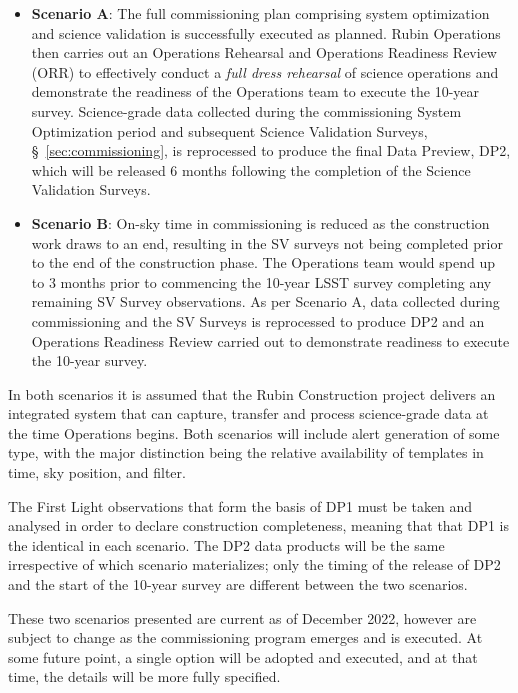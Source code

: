 \begin{itemize}
\item \textbf{Scenario A}:
The full commissioning plan comprising system optimization and science validation is successfully executed as planned. 
Rubin Operations then carries out an Operations Rehearsal and Operations Readiness Review (ORR) to effectively conduct a \textit{full dress rehearsal} of science operations and demonstrate the readiness of the Operations team to execute the 10-year survey. 
Science-grade data collected during the commissioning System Optimization period and subsequent Science Validation Surveys, \S~\ref{sec:commissioning}, is reprocessed to produce the final Data Preview, DP2, which will be released 6 months following the completion of the Science Validation Surveys.

\item \textbf{Scenario B}:
On-sky time in commissioning is reduced as the construction work  draws to an end, resulting in the SV surveys not being completed prior to the end of the construction phase.
The Operations team would spend up to 3 months prior to commencing the 10-year LSST survey completing any remaining SV Survey observations.
As per Scenario A, data collected during commissioning and the SV Surveys is reprocessed to produce DP2 and an Operations Readiness Review carried out to demonstrate readiness to execute the 10-year survey. 
\end{itemize}

In both scenarios it is assumed that the Rubin Construction project delivers an integrated system that can capture, transfer and process science-grade data at the time Operations begins.
Both scenarios will include alert generation of some type, with the major distinction being the relative availability of templates in time, sky position, and filter.

The First Light observations that form the basis of DP1 must be taken and analysed in order to declare construction completeness, meaning that that DP1 is the identical in each scenario.
The DP2 data products will be the same irrespective of which scenario materializes; only the timing of the release of DP2 and the start of the 10-year survey are different between the two scenarios.

These two scenarios presented are current as of December 2022, however are subject to change as the commissioning program emerges and is executed.
At some future point, a single option will be adopted and executed, and at that time, the details will be more fully specified.

